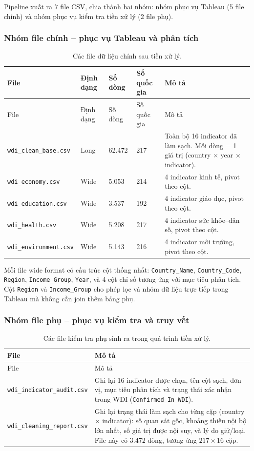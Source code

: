 Pipeline xuất ra 7 file CSV, chia thành hai nhóm: nhóm phục vụ Tableau (5 file chính) và nhóm phục vụ kiểm tra tiền xử lý (2 file phụ).

\subsubsection{Nhóm file chính -- phục vụ Tableau và phân tích}

\begin{longtable}{L{3.8cm}L{1.5cm}L{1.6cm}L{1.5cm}L{5.2cm}}
\caption{Các file dữ liệu chính sau tiền xử lý.}
\label{tab:main-output-files}\\
\toprule
File & Định dạng & Số dòng & Số quốc gia & Mô tả \\
\midrule
\endfirsthead
\toprule
File & Định dạng & Số dòng & Số quốc gia & Mô tả \\
\midrule
\endhead
\texttt{wdi\_clean\_base.csv} & Long & 62.472 & 217 & Toàn bộ 16 indicator đã làm sạch. Mỗi dòng = 1 giá trị (country $\times$ year $\times$ indicator). \\
\texttt{wdi\_economy.csv} & Wide & 5.053 & 214 & 4 indicator kinh tế, pivot theo cột. \\
\texttt{wdi\_education.csv} & Wide & 3.537 & 192 & 4 indicator giáo dục, pivot theo cột. \\
\texttt{wdi\_health.csv} & Wide & 5.208 & 217 & 4 indicator sức khỏe--dân số, pivot theo cột. \\
\texttt{wdi\_environment.csv} & Wide & 5.143 & 216 & 4 indicator môi trường, pivot theo cột. \\
\bottomrule
\end{longtable}

Mỗi file wide format có cấu trúc cột thống nhất: \texttt{Country\_Name}, \texttt{Country\_Code}, \texttt{Region}, \texttt{Income\_Group}, \texttt{Year}, và 4 cột chỉ số tương ứng với mục tiêu phân tích. Cột \texttt{Region} và \texttt{Income\_Group} cho phép lọc và nhóm dữ liệu trực tiếp trong Tableau mà không cần join thêm bảng phụ.

\subsubsection{Nhóm file phụ -- phục vụ kiểm tra và truy vết}

\begin{longtable}{L{5cm}L{9cm}}
\caption{Các file kiểm tra phụ sinh ra trong quá trình tiền xử lý.}
\label{tab:audit-files}\\
\toprule
File & Mô tả \\
\midrule
\endfirsthead
\toprule
File & Mô tả \\
\midrule
\endhead
\texttt{wdi\_indicator\_audit.csv} & Ghi lại 16 indicator được chọn, tên cột sạch, đơn vị, mục tiêu phân tích và trạng thái xác nhận trong WDI (\texttt{Confirmed\_In\_WDI}). \\
\texttt{wdi\_cleaning\_report.csv} & Ghi lại trạng thái làm sạch cho từng cặp (country $\times$ indicator): số quan sát gốc, khoảng thiếu nội bộ lớn nhất, số giá trị được nội suy, và lý do giữ/loại. File này có 3.472 dòng, tương ứng $217 \times 16$ cặp. \\
\bottomrule
\end{longtable}

